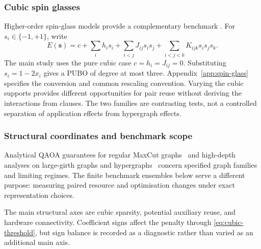 \documentclass[a4paper,onecolumn,11pt,unpublished]{quantumarticle}
\theoremstyle{remark}
\begin{document}
\subsubsection{Cubic spin glasses}

Higher-order spin-glass models provide a complementary benchmark
\cite{Basso2022,PelofskeShortDepth2024,Pelofske2024}.
For $s_i\in\{-1,+1\}$, write
\begin{equation}
 E(\bm s)=c+\sum_i h_is_i+\sum_{i<j}J_{ij}s_is_j
 +\sum_{i<j<k}K_{ijk}s_is_js_k.
 \label{eq:cubic-spin}
\end{equation}
The main study uses the pure cubic case $c=h_i=J_{ij}=0$.
Substituting $s_i=1-2x_i$ gives a PUBO of degree at most three.
Appendix~\ref{app:spin-glass} specifies the conversion and common rescaling
convention. Varying the cubic supports provides different opportunities for
pair reuse without deriving the interactions from clauses. The two families
are contrasting tests, not a controlled separation of application effects
from hypergraph effects.

\subsubsection{Structural coordinates and benchmark scope}
Analytical QAOA guarantees for regular MaxCut graphs~\cite{Wurtz2021}
and high-depth analyses on large-girth graphs and
hypergraphs~\cite{BassoHighDepth2022} concern specified graph families
and limiting regimes. The finite benchmark ensembles below serve a
different purpose: measuring paired resource and optimisation changes
under exact representation choices.

\label{sec:benchmark-generation}

The main structural axes are cubic sparsity, potential auxiliary reuse, and
hardware connectivity. Coefficient signs affect the penalty through
\cref{eq:cubic-threshold}, but sign balance is recorded as a diagnostic rather
than varied as an additional main axis.
\end{document}
